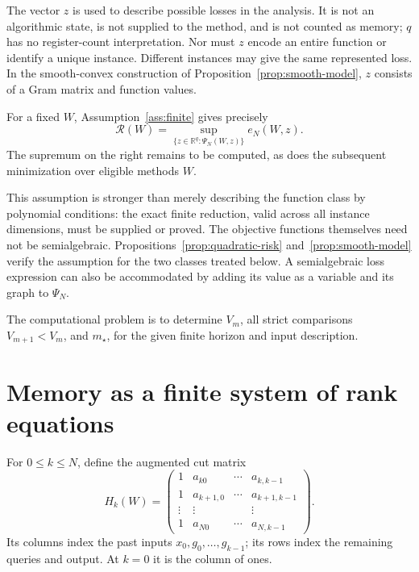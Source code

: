 \documentclass[11pt]{article}
\numberwithin{equation}{section}
\theoremstyle{definition}
\newcommand{\R}{\mathbb R}
\newcommand{\risk}{\mathcal R}
\begin{document}
The vector $z$ is used to describe possible losses in the analysis. It is not an algorithmic state, is not supplied to the method, and is not counted as memory; $q$ has no register-count interpretation. Nor must $z$ encode an entire function or identify a unique instance. Different instances may give the same represented loss. In the smooth-convex construction of Proposition~\ref{prop:smooth-model}, $z$ consists of a Gram matrix and function values.

For a fixed $W$, Assumption~\ref{ass:finite} gives precisely
\[
 \risk(W)=\sup_{\{z\in\R^q:\Psi_N(W,z)\}}e_N(W,z).
\]
The supremum on the right remains to be computed, as does the subsequent minimization over eligible methods $W$.

This assumption is stronger than merely describing the function class by polynomial conditions: the exact finite reduction, valid across all instance dimensions, must be supplied or proved. The objective functions themselves need not be semialgebraic. Propositions~\ref{prop:quadratic-risk} and~\ref{prop:smooth-model} verify the assumption for the two classes treated below. A semialgebraic loss expression can also be accommodated by adding its value as a variable and its graph to $\Psi_N$.

The computational problem is to determine $V_m$, all strict comparisons $V_{m+1}<V_m$, and $m_\star$, for the given finite horizon and input description.

\section{Memory as a finite system of rank equations}
\label{sec:memory}
For $0\le k\le N$, define the augmented cut matrix
\begin{equation}
 H_k(W)=
 \begin{pmatrix}
 1&a_{k0}&\cdots&a_{k,k-1}\\
 1&a_{k+1,0}&\cdots&a_{k+1,k-1}\\
 \vdots&\vdots&&\vdots\\
 1&a_{N0}&\cdots&a_{N,k-1}
 \end{pmatrix}.
 \label{eq:cut}
\end{equation}
Its columns index the past inputs $x_0,g_0,\ldots,g_{k-1}$; its rows index the remaining queries and output. At $k=0$ it is the column of ones.
\end{document}
